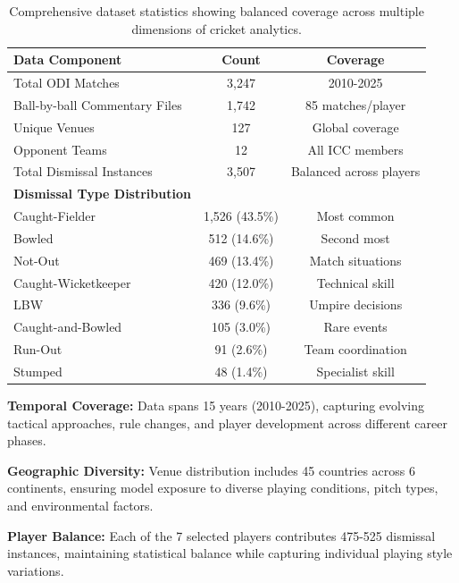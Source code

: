 \documentclass[sigconf,anonymous,review]{acmart}
\begin{document}
\begin{table}[h]
\centering
\small
\renewcommand{\arraystretch}{1.3}
\begin{tabular}{lcc}
\toprule
\textbf{Data Component} & \textbf{Count} & \textbf{Coverage} \\
\midrule
Total ODI Matches & 3,247 & 2010-2025 \\
Ball-by-ball Commentary Files & 1,742 & 85 matches/player \\
Unique Venues & 127 & Global coverage \\
Opponent Teams & 12 & All ICC members \\
Total Dismissal Instances & 3,507 & Balanced across players \\
\midrule
\textbf{Dismissal Type Distribution} & & \\
Caught-Fielder & 1,526 (43.5\%) & Most common \\
Bowled & 512 (14.6\%) & Second most \\
Not-Out & 469 (13.4\%) & Match situations \\
Caught-Wicketkeeper & 420 (12.0\%) & Technical skill \\
LBW & 336 (9.6\%) & Umpire decisions \\
Caught-and-Bowled & 105 (3.0\%) & Rare events \\
Run-Out & 91 (2.6\%) & Team coordination \\
Stumped & 48 (1.4\%) & Specialist skill \\
\bottomrule
\end{tabular}
\caption{Comprehensive dataset statistics showing balanced coverage across multiple dimensions of cricket analytics.}
\label{tab:dataset-statistics}
\end{table}

\textbf{Temporal Coverage:} Data spans 15 years (2010-2025), capturing evolving tactical approaches, rule changes, and player development across different career phases.

\textbf{Geographic Diversity:} Venue distribution includes 45 countries across 6 continents, ensuring model exposure to diverse playing conditions, pitch types, and environmental factors.

\textbf{Player Balance:} Each of the 7 selected players contributes 475-525 dismissal instances, maintaining statistical balance while capturing individual playing style variations.
\end{document}
